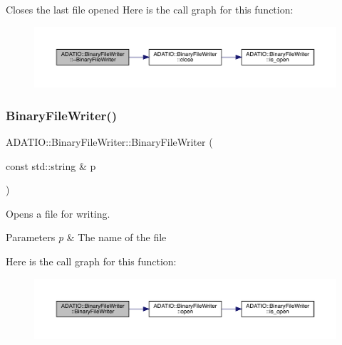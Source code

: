 Closes the last file opened Here is the call graph for this function\+:\nopagebreak
\begin{figure}[H]
\begin{center}
\leavevmode
\includegraphics[width=350pt]{dc/d11/classADATIO_1_1BinaryFileWriter_ae74f92826c49450ba710f22300718ada_cgraph}
\end{center}
\end{figure}
\mbox{\label{classADATIO_1_1BinaryFileWriter_a7ccd0f56a5d98e909770f3198f94e9d9}} 
\subsubsection{\texorpdfstring{BinaryFileWriter()}{BinaryFileWriter()}\hspace{0.1cm}{\footnotesize\ttfamily [2/4]}}
{\footnotesize\ttfamily A\+D\+A\+T\+I\+O\+::\+Binary\+File\+Writer\+::\+Binary\+File\+Writer (\begin{DoxyParamCaption}\item[{const std\+::string \&}]{p }\end{DoxyParamCaption})\hspace{0.3cm}{\ttfamily [explicit]}}

Opens a file for writing. 
\begin{DoxyParams}{Parameters}
{\em p} & The name of the file \\
\hline
\end{DoxyParams}
Here is the call graph for this function\+:\nopagebreak
\begin{figure}[H]
\begin{center}
\leavevmode
\includegraphics[width=350pt]{dc/d11/classADATIO_1_1BinaryFileWriter_a7ccd0f56a5d98e909770f3198f94e9d9_cgraph}
\end{center}
\end{figure}
\mbox{\label{classADATIO_1_1BinaryFileWriter_aa0579bad52db7809ed5d30b964aa3443}} 
